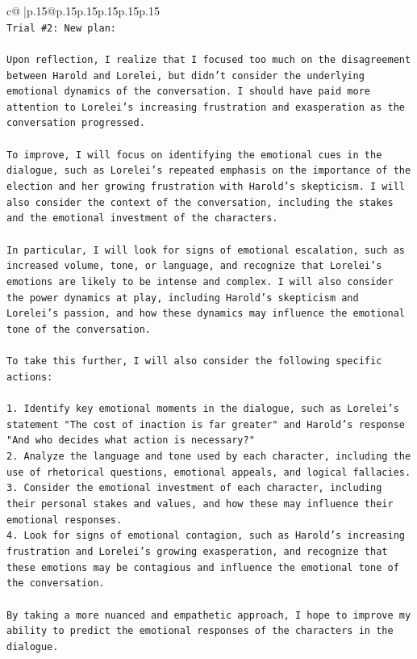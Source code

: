 \documentclass{article}
\begin{document}
{\begin{supertabular}{c@{$\;$}|p{.15\linewidth}@{}p{.15\linewidth}p{.15\linewidth}p{.15\linewidth}p{.15\linewidth}p{.15\linewidth}}
{{{\\ 
\texttt{Trial \#2: New plan: } \\
\\ 
\texttt{Upon reflection, I realize that I focused too much on the disagreement between Harold and Lorelei, but didn't consider the underlying emotional dynamics of the conversation. I should have paid more attention to Lorelei's increasing frustration and exasperation as the conversation progressed. } \\
\\ 
\texttt{To improve, I will focus on identifying the emotional cues in the dialogue, such as Lorelei's repeated emphasis on the importance of the election and her growing frustration with Harold's skepticism. I will also consider the context of the conversation, including the stakes and the emotional investment of the characters.} \\
\\ 
\texttt{In particular, I will look for signs of emotional escalation, such as increased volume, tone, or language, and recognize that Lorelei's emotions are likely to be intense and complex. I will also consider the power dynamics at play, including Harold's skepticism and Lorelei's passion, and how these dynamics may influence the emotional tone of the conversation.} \\
\\ 
\texttt{To take this further, I will also consider the following specific actions:} \\
\\ 
\texttt{1. Identify key emotional moments in the dialogue, such as Lorelei's statement "The cost of inaction is far greater" and Harold's response "And who decides what action is necessary?"} \\
\texttt{2. Analyze the language and tone used by each character, including the use of rhetorical questions, emotional appeals, and logical fallacies.} \\
\texttt{3. Consider the emotional investment of each character, including their personal stakes and values, and how these may influence their emotional responses.} \\
\texttt{4. Look for signs of emotional contagion, such as Harold's increasing frustration and Lorelei's growing exasperation, and recognize that these emotions may be contagious and influence the emotional tone of the conversation.} \\
\\ 
\texttt{By taking a more nuanced and empathetic approach, I hope to improve my ability to predict the emotional responses of the characters in the dialogue.} \\
}}}
\end{supertabular}}
\end{document}
